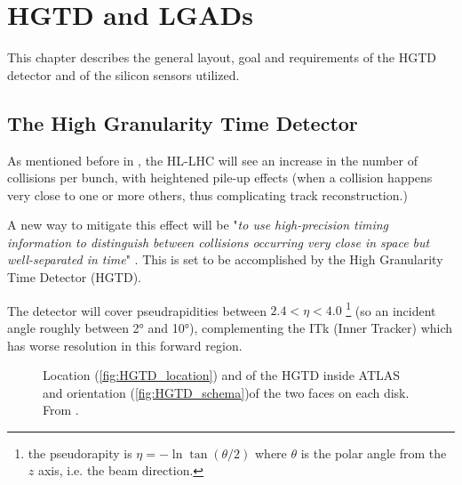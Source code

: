 \chapter{HGTD and LGADs}\label{chap:HGTD_LGADs}

This chapter describes the general layout, goal and requirements of the HGTD detector and of the silicon sensors utilized.

\section{The High Granularity Time Detector}\label{sec:HGTD}

As mentioned before in , the HL-LHC will see an increase in the number of collisions per bunch, with heightened pile-up effects (when a collision happens very close to one or more others, thus complicating track reconstruction.) 
 
A new way to mitigate this effect will be "\textit{to use high-precision timing information to distinguish between collisions occurring very close in space but well-separated in time}" \cite{CERN-LHCC-2020-007}. This is set to be accomplished by the High Granularity Time Detector (HGTD).
 
The detector will cover pseudrapidities between $2.4 < \eta < 4.0$ \footnote{the pseudorapity is $\eta=-\ln \tan(\theta/2)$ where $\theta$ is the polar angle from the $z$ axis, i.e. the beam direction.} (so an incident angle roughly between 2° and 10°), complementing the ITk (Inner Tracker) which has worse resolution in this forward region. %
\begin{figure}[!ht]
    \centering
    \hfill
    \centering
    \caption{Location (\ref{fig:HGTD_location}) and of the HGTD inside ATLAS and orientation (\ref{fig:HGTD_schema})of the two faces on each disk. From \cite{cernTechnicalDesign}.}
\end{figure}

